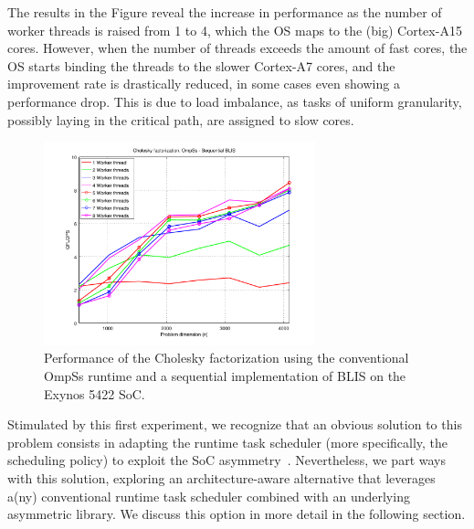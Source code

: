 %
The results in the
Figure reveal the increase in performance as the number of worker threads is raised from 1 to 4, which the OS maps
to the (big) Cortex-A15 cores. However, when the number of threads exceeds the amount of fast cores, the OS starts binding the threads
to the slower Cortex-A7 cores, and the improvement rate is drastically reduced, 
in some cases even showing a performance drop. This
is due to load imbalance, as tasks of uniform granularity, possibly laying in the critical path,
are assigned to slow cores. %

\begin{figure}
\centering
\includegraphics[width=0.70\textwidth]{Plots/Orig_runtime/plot_1to8_th}
\caption{Performance of the Cholesky factorization using the conventional OmpSs runtime and a sequential implementation
                 of BLIS on the Exynos 5422 SoC.}
\label{fig:ompss_blis_oversubscription}
\end{figure}

Stimulated by this first experiment, we recognize that an obvious solution to this problem consists in 
adapting the runtime task scheduler (more specifically, the scheduling policy) to exploit the 
SoC asymmetry~\cite{OmpSsbigLITTLE}.
Nevertheless, we part ways with this
solution, exploring an architecture-aware alternative
that leverages a(ny) conventional runtime task scheduler combined with an underlying asymmetric library. 
We discuss this option in more detail in the following section.

